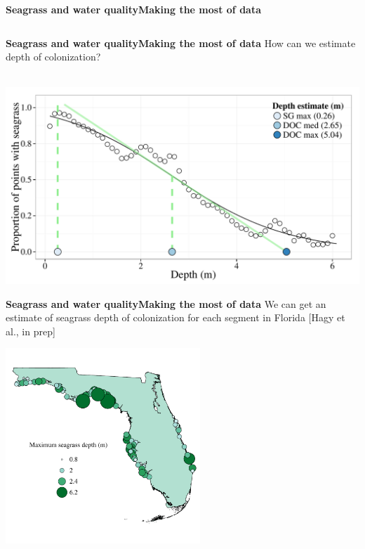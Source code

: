 \documentclass[serif]{beamer}\usepackage[]{graphicx}\usepackage[]{color}
\newenvironment{knitrout}{}{} %
\begin{document}
\begin{frame}{\textbf{Seagrass and water quality}}{\textbf{Making the most of data}}
\begin{columns}[T]
\begin{column}{0.32\textwidth}
\begin{knitrout}
{}



\end{knitrout}
\end{column}
\end{columns}
\end{frame}

\begin{frame}{\textbf{Seagrass and water quality}}{\textbf{Making the most of data}}
\onslide<+->
How can we estimate depth of colonization? \\~\\


{\centering \includegraphics[width=\textwidth]{fig//sg_est_ex} 

}



\end{frame}



\begin{frame}{\textbf{Seagrass and water quality}}{\textbf{Making the most of data}}
We can get an estimate of seagrass depth of colonization for each segment in Florida \scriptsize [Hagy et al., in prep]
\vspace{-0.25in}
\centerline{\includegraphics[width = 0.55\textwidth]{fig/sgdepthall.pdf}}
\end{frame}
\end{document}
